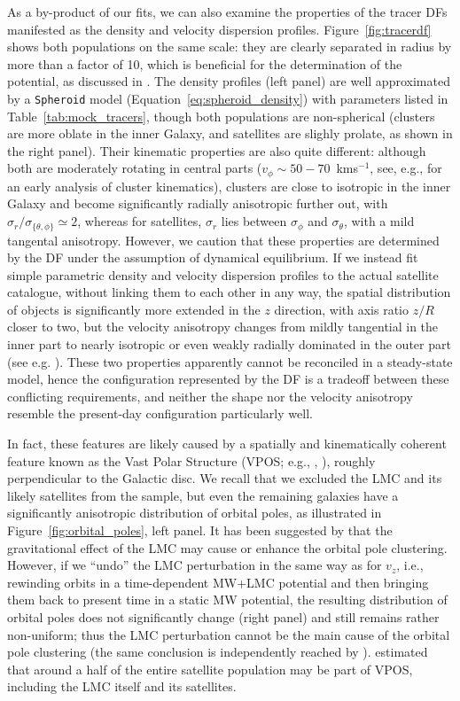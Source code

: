 \documentclass[usenatbib,fleqn]{mnras}
\newcommand{\kms}{km\:s$^{-1}$\xspace}
\begin{document}
As a by-product of our fits, we can also examine the properties of the tracer DFs manifested as the density and velocity dispersion profiles. Figure~\ref{fig:tracerdf} shows both populations on the same scale: they are clearly separated in radius by more than a factor of 10, which is beneficial for the determination of the potential, as discussed in \citet{Walker2011}. The density profiles (left panel) are well approximated by a \texttt{Spheroid} model (Equation~\ref{eq:spheroid_density}) with parameters listed in Table~\ref{tab:mock_tracers}, though both populations are non-spherical (clusters are more oblate in the inner Galaxy, and satellites are slighly prolate, as shown in the right panel). Their kinematic properties are also quite different: although both are moderately rotating in central parts ($v_\phi\sim 50-70$~\kms, see, e.g., \citealt{Frenk1980} for an early analysis of cluster kinematics), clusters are close to isotropic in the inner Galaxy and become significantly radially anisotropic further out, with $\sigma_r/\sigma_{\{\theta,\phi\}} \simeq 2$, whereas for satellites, $\sigma_r$ lies between $\sigma_\phi$ and $\sigma_\theta$, with a mild tangental anisotropy.
However, we caution that these properties are determined by the DF under the assumption of dynamical equilibrium. If we instead fit simple parametric density and velocity dispersion profiles to the actual satellite catalogue, without linking them to each other in any way, the spatial distribution of objects is significantly more extended in the $z$ direction, with axis ratio $z/R$ closer to two, but the velocity anisotropy changes from mildly tangential in the inner part to nearly isotropic or even weakly radially dominated in the outer part (see e.g. \citealt{Riley2019}). These two properties apparently cannot be reconciled in a steady-state model, hence the configuration represented by the DF is a tradeoff between these conflicting requirements, and neither the shape nor the velocity anisotropy resemble the present-day configuration particularly well.

In fact, these features are likely caused by a spatially and kinematically coherent feature known as the Vast Polar Structure (VPOS; e.g., \citealt{Kroupa2005}, \citealt{Pawlowski2020}), roughly perpendicular to the Galactic disc. We recall that we excluded the LMC and its likely satellites from the sample, but even the remaining galaxies have a significantly anisotropic distribution of orbital poles, as illustrated in Figure~\ref{fig:orbital_poles}, left panel. It has been suggested by \citet{GaravitoCamargo2021} that the gravitational effect of the LMC may cause or enhance the orbital pole clustering. However, if we ``undo'' the LMC perturbation in the same way as for $v_z$, i.e., rewinding orbits in a time-dependent MW+LMC potential and then bringing them back to present time in a static MW potential, the resulting distribution of orbital poles does not significantly change (right panel) and still remains rather non-uniform; thus the LMC perturbation cannot be the main cause of the orbital pole clustering (the same conclusion is independently reached by \citealt{Pawlowski2021}). \citet{Li2021} estimated that around a half of the entire satellite population may be part of VPOS, including the LMC itself and its satellites.
\end{document}
